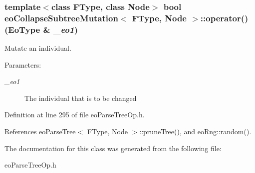 \subsubsection{\setlength{\rightskip}{0pt plus 5cm}template$<$class FType, class Node$>$ bool {\bf eo\-Collapse\-Subtree\-Mutation}$<$ FType, Node $>$::operator() ({\bf Eo\-Type} \& {\em \_\-eo1})\hspace{0.3cm}{\tt  [inline]}}\label{classeo_collapse_subtree_mutation_a3}


Mutate an individual. 

\begin{Desc}
\item[Parameters:]
\begin{description}
\item[{\em \_\-eo1}]The individual that is to be changed \end{description}
\end{Desc}


Definition at line 295 of file eo\-Parse\-Tree\-Op.h.

References eo\-Parse\-Tree$<$ FType, Node $>$::prune\-Tree(), and eo\-Rng::random().

The documentation for this class was generated from the following file:\begin{CompactItemize}
\item 
eo\-Parse\-Tree\-Op.h\end{CompactItemize}
